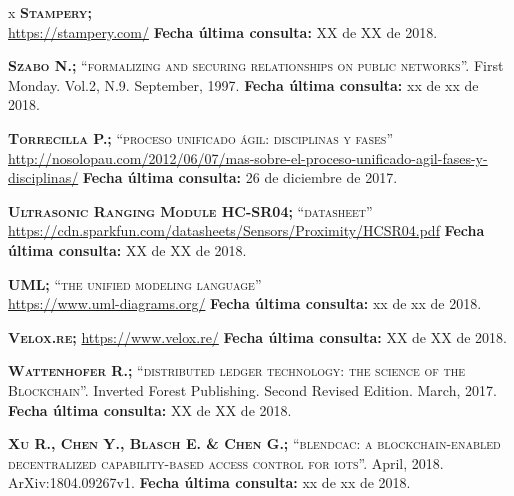 \begin{thebibliography} {x}
	 \textsc{\textbf{Stampery; }} \\
	\url{https://stampery.com/}
	\newline \textbf{Fecha última consulta:} XX de XX de 2018.
				
	 \textsc{\textbf{Szabo N.; }} \textsc{“formalizing and securing relationships on public networks”.} First Monday. Vol.2, N.9. September, 1997.	
	\newline \textbf{Fecha última consulta:} xx de xx de 2018.
		
	 \textsc{\textbf{Torrecilla P.; }}\textsc{“proceso unificado ágil: disciplinas y fases”} \\ 
	\url{http://nosolopau.com/2012/06/07/mas-sobre-el-proceso-unificado-agil-fases-y-disciplinas/}
	\newline \textbf{Fecha última consulta:} 26 de diciembre de 2017.
		
	 \textsc{\textbf{Ultrasonic Ranging Module HC-SR04; }}\textsc{“datasheet”} \\
	\url{https://cdn.sparkfun.com/datasheets/Sensors/Proximity/HCSR04.pdf}
	\newline \textbf{Fecha última consulta:} XX de XX de 2018.
				
	 \textsc{\textbf{UML; }}\textsc{“the unified modeling language”} \\ 
	\url{https://www.uml-diagrams.org/}
	\newline \textbf{Fecha última consulta:} xx de xx de 2018.	
		
	 \textsc{\textbf{Velox.re; }} 
	\url{https://www.velox.re/}
	\newline \textbf{Fecha última consulta:} XX de XX de 2018.
	
	 \textsc{\textbf{Wattenhofer R.; }}\textsc{“distributed ledger technology: the science of the Blockchain”.} Inverted Forest Publishing. Second Revised Edition. March, 2017.
	\newline \textbf{Fecha última consulta:} XX de XX de 2018.
	
	 \textsc{\textbf{Xu R., Chen Y., Blasch E. \& Chen G.; }} \textsc{“blendcac: a blockchain-enabled decentralized capability-based access control for iots”.} April, 2018. ArXiv:1804.09267v1.
	\newline \textbf{Fecha última consulta:} xx de xx de 2018.
	

\end{thebibliography}

